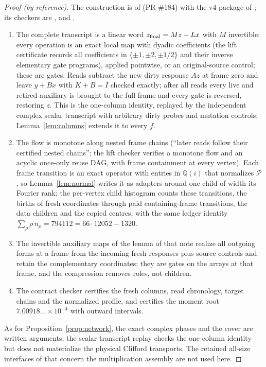 \documentclass[11pt]{article}
\theoremstyle{definition}
\begin{document}
\begin{proof}[Proof (by reference)]
The construction is  of \cite{cms}
(PR \#184) with the v4 package  of
\cite{pr194}; its checkers are ,
 and .
\begin{enumerate}
\item The complete transcript is a linear word $z_{\rm final}=Mz+Lx$ with $M$
  invertible: every operation is an exact local map with dyadic coefficients
  (the lift certificate records all coefficients in $\{\pm1,\pm2,\pm1/2\}$
  and their inverse elementary gate programs), applied pointwise, or an
  original-source control; these are gates. Reads subtract the new dirty
  response $Az$ at frame zero and leave $y+Bx$ with $K+B=I$ checked exactly;
  after all reads every live and retired auxiliary is brought to the full
  frame and every gate is reversed, restoring $z$. This is the one-column
  identity, replayed by the independent complex scalar transcript with
  arbitrary dirty probes and mutation controls; Lemma~\ref{lem:columns}
  extends it to every $f$.
\item The flow is monotone along nested frame chains (``later reads follow
  their certified nested chains''; the lift checker verifies a monotone flow
  and an acyclic once-only reuse DAG, with frame containment at every
  vertex). Each frame transition is an exact operator with entries in
  $\mathbb Q(i)$ that normalizes $\mathcal P$, so Lemma~\ref{lem:normal} writes
  it as adapters around one child of width its Fourier rank; the per-vertex
  child histogram counts these transitions, the births of fresh coordinates
  through paid containing-frame transitions, the data children and the
  copied centres, with the same ledger identity
  $\sum_\rho\rho\,n_\rho=794112=66\cdot12052-1320$.
\item The invertible auxiliary maps of the lemma of that note realize all
  outgoing forms at a frame from the incoming fresh responses plus
  source controls and retain the complementary coordinates; they are gates
  on the arrays at that frame, and the compression removes roles, not
  children.
\item The contract checker certifies the fresh columns, read chronology,
  target chains and the normalized profile, and \cite{pr194} certifies the
  moment root $7.00918\ldots\times10^{-4}$ with outward intervals.
\end{enumerate}
As for Proposition~\ref{prop:network}, the exact complex phases and the cover
are written arguments; the scalar transcript replay checks the one-column
identity but does not materialize the physical Clifford transports. The
retained all-size interfaces of \cite{pr194} that concern the multiplication
assembly are not used here.
\end{proof}
\end{document}
